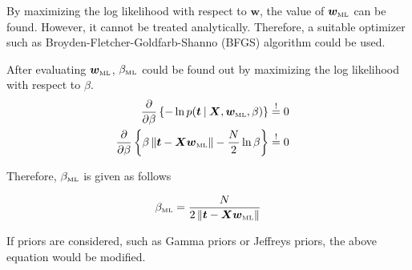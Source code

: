 \documentclass[11pt]{article}
\newcommand{\mle}[1]{{#1}_{\text{\tiny ML}}}
\newcommand\given[1][]{\:#1\vert\:}
\newcommand{\norm}[1]{\left\lVert#1\right\rVert}
\begin{document}
By maximizing the log likelihood with respect to $\bm{w}$, the value of $\mle{\bm{w}}$ can be found. However, it cannot be treated analytically. Therefore, a suitable optimizer such as Broyden-Fletcher-Goldfarb-Shanno (BFGS) algorithm could be used. 

After evaluating $\mle{\bm{w}}$, $\mle{\beta}$ could be found out by maximizing the log likelihood with respect to $\beta$. 
\begin{eqnarray}
    \frac{\partial }{\partial  \beta} \left\{ -\ln{p(\bm{t} \given \bm{X}, \mle{\bm{w}}, \beta)} \right\} 
    &\overset{!}{=} 0& \\
    \frac{\partial }{\partial  \beta} \left\{\beta \norm{\bm{t} - \bm{X\mle{\bm{w}}}} - \frac{N}{2}\ln{\beta} \right\}
    &\overset{!}{=} 0&
\end{eqnarray}

Therefore, $\mle{\beta}$ is given as follows

\begin{equation}
    \mle{\beta} = \frac{N}{2\norm{\bm{t} - \bm{X\mle{\bm{w}}}}}
\end{equation}

If priors are considered, such as Gamma priors or Jeffreys priors, the above equation would be modified.
\end{document}
